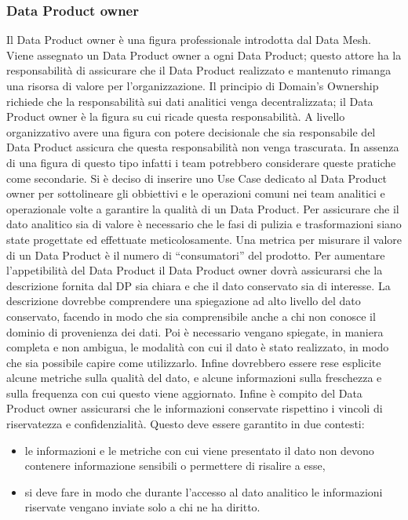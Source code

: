 \documentclass[12pt]{report}
\begin{document}
\subsubsection{Data Product owner}
Il Data Product owner è una figura professionale introdotta dal Data Mesh.
Viene assegnato un Data Product owner a ogni Data Product; questo attore ha la responsabilità di assicurare che il Data Product realizzato e mantenuto rimanga una risorsa di valore per l'organizzazione. 
Il principio di Domain's Ownership richiede che la responsabilità sui dati analitici venga decentralizzata; il Data Product owner è la figura su cui ricade questa responsabilità.
A livello organizzativo avere una figura con potere decisionale che sia responsabile del Data Product assicura che questa responsabilità non venga trascurata.
In assenza di una figura di questo tipo infatti i team potrebbero considerare queste pratiche come secondarie.
Si è deciso di inserire uno Use Case dedicato al Data Product owner per sottolineare gli obbiettivi e le operazioni comuni nei team analitici e operazionale volte a garantire la qualità di un Data Product.
Per assicurare che il dato analitico sia di valore è necessario che le fasi di pulizia e trasformazioni siano state progettate ed  effettuate meticolosamente.
Una metrica per misurare il valore di un  Data Product è il numero di ``consumatori'' del prodotto.
Per aumentare l'appetibilità del Data Product il Data Product owner dovrà assicurarsi che la descrizione fornita dal DP sia chiara e che il dato conservato sia di interesse. 
La descrizione dovrebbe comprendere una spiegazione ad alto livello del dato conservato, facendo in modo che sia comprensibile anche a chi non conosce il dominio di provenienza dei dati.
Poi è necessario vengano spiegate, in maniera completa e non ambigua, le modalità con cui il dato è stato realizzato, in modo che sia possibile capire come utilizzarlo.
Infine dovrebbero essere rese esplicite alcune metriche sulla qualità del dato, e alcune informazioni sulla freschezza e sulla frequenza con cui questo viene aggiornato.
Infine è compito del Data Product owner assicurarsi che le informazioni conservate rispettino i vincoli di riservatezza e confidenzialità.
Questo deve essere garantito in due contesti:
\begin{itemize}
    \item le informazioni e le metriche con cui viene presentato il dato non devono contenere informazione sensibili o permettere di risalire a esse,
    \item si deve fare in modo che durante l'accesso al dato analitico le informazioni riservate vengano inviate solo a chi ne ha diritto.
\end{itemize}
\end{document}
